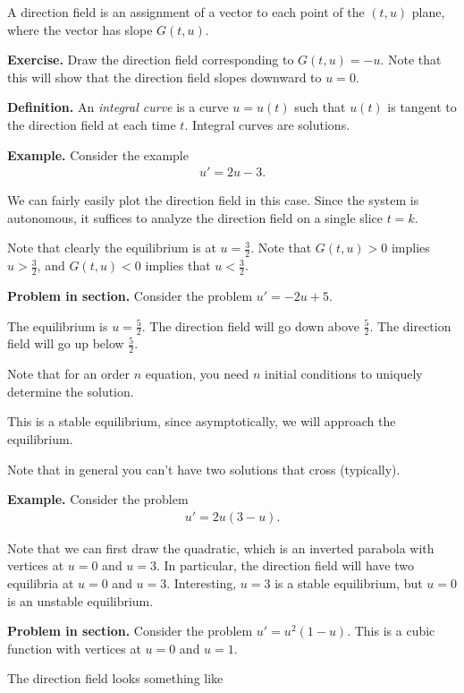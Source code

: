 \documentclass{article}
\begin{document}
A direction field is an assignment of a vector to each point of the $(t, u)$ plane, where the vector has slope $G(t, u)$.

{\bf Exercise.} Draw the direction field corresponding to $G(t, u) = -u$.  Note that this will show that the direction field slopes downward to $u = 0$.

{\bf Definition.} An {\it integral curve} is a curve $u = u(t)$ such that $u(t)$ is tangent to the direction field at each time $t$.  Integral curves are solutions.

{\bf Example.} Consider the example
\begin{align*}
  u' = 2u-3.
\end{align*}

We can fairly easily plot the direction field in this case.  Since the system is autonomous, it suffices to analyze the direction field on a single slice $t = k$.

Note that clearly the equilibrium is at $u = \frac{3}{2}$.  Note that $G(t, u) > 0$ implies $u > \frac{3}{2}$, and $G(t, u) < 0$ implies that $u < \frac{3}{2}$.

{\bf Problem in section.} Consider the problem $u' = -2u + 5$. 

The equilibrium is $u = \frac{5}{2}$.  The direction field will go down above $\frac{5}{2}$.  The direction field will go up below $\frac{5}{2}$.

Note that for an order $n$ equation, you need $n$ initial conditions to uniquely determine the solution.

This is a stable equilibrium, since asymptotically, we will approach the equilibrium.

Note that in general you can't have two solutions that cross (typically).

{\bf Example.} Consider the problem
\begin{align*}
  u' = 2u(3 - u).
\end{align*}

Note that we can first draw the quadratic, which is an inverted parabola with vertices at $u = 0$ and $u =3$.  In particular, the direction field will have two equilibria at $u = 0$ and $u = 3$.  Interesting, $u = 3$ is a stable equilibrium, but $u = 0$ is an unstable equilibrium.

{\bf Problem in section.} Consider the problem $u' = u^2(1 - u)$.  This is a cubic function with vertices at $u = 0$ and $u = 1$.  

The direction field looks something like
\end{document}
